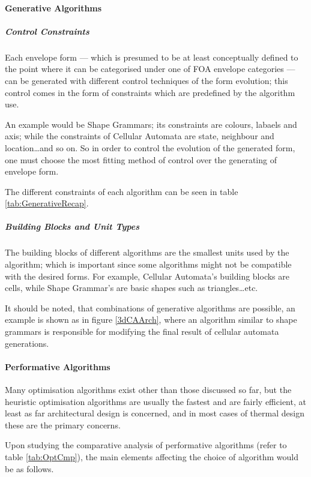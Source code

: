 \paragraph{Generative Algorithms}\mbox{}

\subparagraph{Control Constraints}

Each envelope form --- which is presumed to be at least conceptually defined to the point where it can be categorised under one of FOA envelope categories --- can be generated with different control techniques of the form evolution; this control comes in the form of constraints which are predefined by the algorithm use.

An example would be Shape Grammars; its constraints are colours, labaels and axis; while the constraints of Cellular Automata are state, neighbour and location\ldots and so on. So in order to control the evolution of the generated form, one must choose the most fitting method of control over the generating of envelope form.

The different constraints of each algorithm can be seen in table \ref{tab:GenerativeRecap}.

\subparagraph{Building Blocks and Unit Types}

The building blocks of different algorithms are the smallest units used by the algorithm; which is important since some algorithms might not be compatible with the desired forms. For example, Cellular Automata's building blocks are cells, while Shape Grammar's are basic shapes such as triangles\ldots{}etc.

It should be noted, that combinations of generative algorithms are possible, an example is shown as in figure \ref{3dCAArch}, where an algorithm similar to shape grammars is responsible for modifying the final result of cellular automata generations.

\paragraph{Performative Algorithms}\mbox{}

Many optimisation algorithms exist other than those discussed so far, but the heuristic optimisation algorithms are usually the fastest and are fairly efficient, at least as far architectural design is concerned, and in most cases of thermal design these are the primary concerns.

Upon studying the comparative analysis of performative algorithms (refer to table \ref{tab:OptCmp}), the main elements affecting the choice of algorithm would be as follows.

